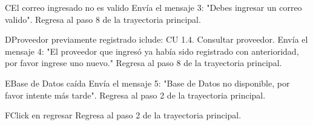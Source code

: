 \begin{UCtrayectoriaA}{C}{El correo ingresado no es valido}
	\UCpaso[\UCsist] Envía el mensaje 3: "Debes ingresar un correo valido".			
	\UCpaso[] Regresa al paso 8 de la trayectoria principal.
\end{UCtrayectoriaA}

\begin{UCtrayectoriaA}{D}{Proveedor previamente registrado}
	\UCpaso[\UCsist] iclude: CU 1.4. Consultar proveedor. 
	\UCpaso[\UCsist] Envía el mensaje 4: "El proveedor que ingresó ya había sido registrado con anterioridad, por favor ingrese uno nuevo."			
	\UCpaso[] Regresa al paso 8 de la trayectoria principal.
\end{UCtrayectoriaA}

\begin{UCtrayectoriaA}{E}{Base de Datos caída}
	\UCpaso[\UCsist] Envía el mensaje 5: "Base de Datos no disponible, por favor intente más tarde".			
	\UCpaso[] Regresa al paso 2 de la trayectoria principal.
\end{UCtrayectoriaA}
\begin{UCtrayectoriaA}{F}{Click en regresar}
	\UCpaso[] Regresa al paso 2 de la trayectoria principal.
\end{UCtrayectoriaA}